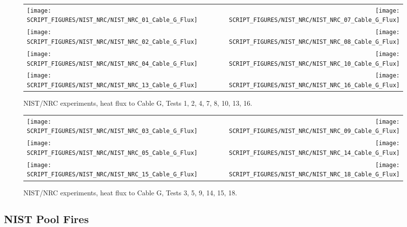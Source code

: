 \begin{figure}[p]
\begin{tabular*}{\textwidth}{l@{\extracolsep{\fill}}r}
\texttt{[image: SCRIPT\_FIGURES/NIST\_NRC/NIST\_NRC\_01\_Cable\_G\_Flux]} &
\texttt{[image: SCRIPT\_FIGURES/NIST\_NRC/NIST\_NRC\_07\_Cable\_G\_Flux]} \\
\texttt{[image: SCRIPT\_FIGURES/NIST\_NRC/NIST\_NRC\_02\_Cable\_G\_Flux]} &
\texttt{[image: SCRIPT\_FIGURES/NIST\_NRC/NIST\_NRC\_08\_Cable\_G\_Flux]} \\
\texttt{[image: SCRIPT\_FIGURES/NIST\_NRC/NIST\_NRC\_04\_Cable\_G\_Flux]} &
\texttt{[image: SCRIPT\_FIGURES/NIST\_NRC/NIST\_NRC\_10\_Cable\_G\_Flux]} \\
\texttt{[image: SCRIPT\_FIGURES/NIST\_NRC/NIST\_NRC\_13\_Cable\_G\_Flux]} &
\texttt{[image: SCRIPT\_FIGURES/NIST\_NRC/NIST\_NRC\_16\_Cable\_G\_Flux]}
\end{tabular*}
\caption[NIST/NRC experiments, heat flux to Cable G, Tests 1, 2, 4, 7, 8, 10, 13, 16]
{NIST/NRC experiments, heat flux to Cable G, Tests 1, 2, 4, 7, 8, 10, 13, 16.}
\label{NIST_NRC_Cable_G_Flux_Closed}
\end{figure}

\begin{figure}[p]
\begin{tabular*}{\textwidth}{l@{\extracolsep{\fill}}r}
\texttt{[image: SCRIPT\_FIGURES/NIST\_NRC/NIST\_NRC\_03\_Cable\_G\_Flux]} &
\texttt{[image: SCRIPT\_FIGURES/NIST\_NRC/NIST\_NRC\_09\_Cable\_G\_Flux]} \\
\texttt{[image: SCRIPT\_FIGURES/NIST\_NRC/NIST\_NRC\_05\_Cable\_G\_Flux]} &
\texttt{[image: SCRIPT\_FIGURES/NIST\_NRC/NIST\_NRC\_14\_Cable\_G\_Flux]} \\
\texttt{[image: SCRIPT\_FIGURES/NIST\_NRC/NIST\_NRC\_15\_Cable\_G\_Flux]} &
\texttt{[image: SCRIPT\_FIGURES/NIST\_NRC/NIST\_NRC\_18\_Cable\_G\_Flux]}
\end{tabular*}
\caption[NIST/NRC experiments, heat flux to Cable G, Tests 3, 5, 9, 14, 15, 18]
{NIST/NRC experiments, heat flux to Cable G, Tests 3, 5, 9, 14, 15, 18.}
\label{NIST_NRC_Cable_G_Flux_Open}
\end{figure}


\clearpage

\subsection{NIST Pool Fires}
\label{NIST_Pool_Fires_Heat_Flux_Results}

